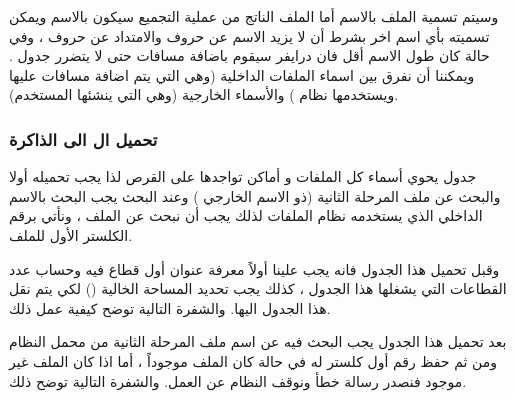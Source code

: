 \documentclass[document.tex]{subfiles}
\begin{document}
وسيتم تسمية الملف بالاسم  أما الملف الناتج من عملية التجميع سيكون بالاسم  ويمكن تسميته بأي اسم اخر بشرط أن لا يزيد الاسم عن  حروف والامتداد عن  حروف ، وفي حالة كان طول الاسم أقل فان درايفر  سيقوم باضافة مسافات  حتى لا يتضرر جدول . ويمكننا أن نفرق بين اسماء الملفات الداخلية (وهي التي يتم اضافة مسافات عليها ويستخدمها نظام ) والأسماء الخارجية (وهي التي ينشئها المستخدم).

\subsubsection{تحميل ال  الى الذاكرة}
جدول  يحوي أسماء كل الملفات و أماكن تواجدها على القرص لذا يجب تحميله أولا والبحث عن ملف المرحلة الثانية (ذو الاسم الخارجي ) وعند البحث يجب البحث بالاسم الداخلي الذي يستخدمه نظام الملفات لذلك يجب أن نبحث عن الملف  ، ونأتي برقم الكلستر الأول للملف.

وقبل تحميل هذا الجدول فانه يجب علينا أولاً معرفة عنوان أول قطاع فيه وحساب عدد القطاعات التي يشغلها هذا الجدول ، كذلك يجب تحديد المساحة الخالية () لكي يتم نقل هذا الجدول اليها. والشفرة التالية توضح كيفية عمل ذلك.
 
\begin{english}
\lstset{numberstyle=\tiny,numbersep=5pt,tabsize=2,extendedchars=true,breaklines=true,frame=b,showspaces=false, showtabs=false,xleftmargin=10pt,framexleftmargin=10pt,framexrightmargin=5pt,framexbottommargin=4pt,showstringspaces=false,language=[x86masm]Assembler}


\end{english}

بعد تحميل هذا الجدول يجب البحث فيه عن اسم ملف المرحلة الثانية من محمل النظام ومن ثم حفظ رقم أول كلستر له في حالة كان الملف موجوداً ، أما اذا كان الملف غير موجود فنصدر رسالة خطأ ونوقف النظام عن العمل. والشفرة التالية توضح ذلك.

\begin{english}
\lstset{numberstyle=\tiny,numbersep=5pt,tabsize=2,extendedchars=true,breaklines=true,frame=b,showspaces=false, showtabs=false,xleftmargin=10pt,framexleftmargin=10pt,framexrightmargin=5pt,framexbottommargin=4pt,showstringspaces=false,language=[x86masm]Assembler}


\end{english}
\end{document}
